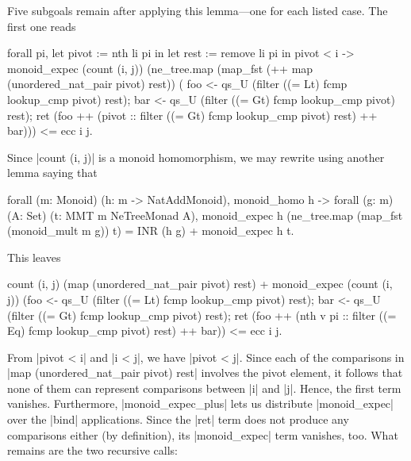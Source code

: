 \documentclass[runningheads]{llncs}
\begin{document}
Five subgoals remain after applying 
    this 
lemma---one for each 
    listed case. 
The first one reads
\begin{code}
  forall pi,
    let pivot := nth li pi in
    let rest := remove li pi in
      pivot < i ->
      monoid_expec (count (i, j))
        (ne_tree.map (map_fst (++ map (unordered_nat_pair pivot) rest)) (
          foo <- qs_U (filter ((= Lt) fcmp lookup_cmp pivot) rest);
          bar <- qs_U (filter ((= Gt) fcmp lookup_cmp pivot) rest);
          ret (foo ++ (pivot :: filter ((= Gt) fcmp lookup_cmp pivot) rest) ++ bar)))
        <= ecc i j.
  \end{code}
Since |count (i, j)| is a monoid homomorphism, we may rewrite using another lemma saying that
\begin{code}
  forall (m: Monoid) (h: m -> NatAddMonoid), monoid_homo h ->
  forall (g: m) (A: Set) (t: MMT m NeTreeMonad A),
    monoid_expec h (ne_tree.map (map_fst (monoid_mult m g)) t) =
    INR (h g) + monoid_expec h t.
\end{code}
This leaves
\begin{code}
    count (i, j) (map (unordered_nat_pair pivot) rest) +
    monoid_expec (count (i, j))
      (foo <- qs_U (filter ((= Lt) fcmp lookup_cmp pivot) rest);
      bar <- qs_U (filter ((= Gt) fcmp lookup_cmp pivot) rest);
      ret  (foo ++ (nth v pi :: filter ((= Eq) fcmp lookup_cmp pivot) rest) ++ bar))
    <= ecc i j.
\end{code}
From |pivot < i| and |i < j|, we have |pivot < j|. Since each of the comparisons in |map (unordered_nat_pair pivot) rest| involves the pivot element, it follows that none of them can represent comparisons between |i| and |j|. Hence, the first term vanishes. Furthermore, |monoid_expec_plus| lets us distribute |monoid_expec| over the |bind| applications. Since the |ret| term does not produce any comparisons either (by definition), its |monoid_expec| term vanishes, too. What remains are the two recursive calls:
\end{document}
